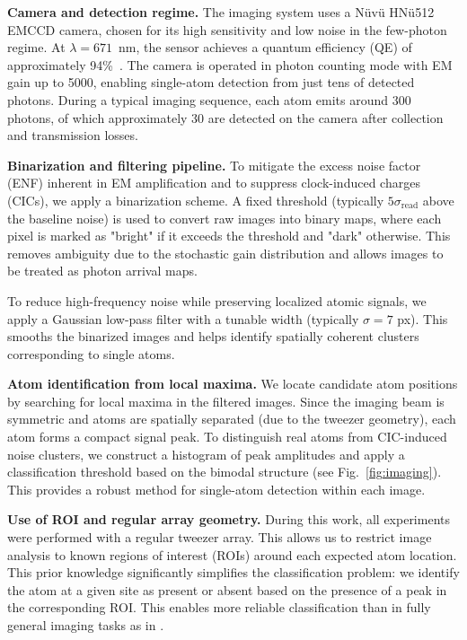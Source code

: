 
\textbf{Camera and detection regime.}  
The imaging system uses a Nüvü HNü512 EMCCD camera, chosen for its high sensitivity and low noise in the few-photon regime. At $\lambda = 671$~nm, the sensor achieves a quantum efficiency (QE) of approximately 94\%~\cite{kruip_design_2024}. The camera is operated in photon counting mode with EM gain up to 5000, enabling single-atom detection from just tens of detected photons. During a typical imaging sequence, each atom emits around 300 photons, of which approximately 30 are detected on the camera after collection and transmission losses.

\textbf{Binarization and filtering pipeline.}  
To mitigate the excess noise factor (ENF) inherent in EM amplification and to suppress clock-induced charges (CICs), we apply a binarization scheme. A fixed threshold (typically $5\sigma_\text{read}$ above the baseline noise) is used to convert raw images into binary maps, where each pixel is marked as "bright" if it exceeds the threshold and "dark" otherwise. This removes ambiguity due to the stochastic gain distribution and allows images to be treated as photon arrival maps.  

To reduce high-frequency noise while preserving localized atomic signals, we apply a Gaussian low-pass filter with a tunable width (typically $\sigma = 7$ px). This smooths the binarized images and helps identify spatially coherent clusters corresponding to single atoms. 

\textbf{Atom identification from local maxima.}  
We locate candidate atom positions by searching for local maxima in the filtered images. Since the imaging beam is symmetric and atoms are spatially separated (due to the tweezer geometry), each atom forms a compact signal peak. To distinguish real atoms from CIC-induced noise clusters, we construct a histogram of peak amplitudes and apply a classification threshold based on the bimodal structure (see Fig.~\ref{fig:imaging}). This provides a robust method for single-atom detection within each image.

\textbf{Use of ROI and regular array geometry.}  
During this work, all experiments were performed with a regular tweezer array. This allows us to restrict image analysis to known regions of interest (ROIs) around each expected atom location. This prior knowledge significantly simplifies the classification problem: we identify the atom at a given site as present or absent based on the presence of a peak in the corresponding ROI. This enables more reliable classification than in fully general imaging tasks as in \cite{bergschneider_spin-resolved_2018}.

